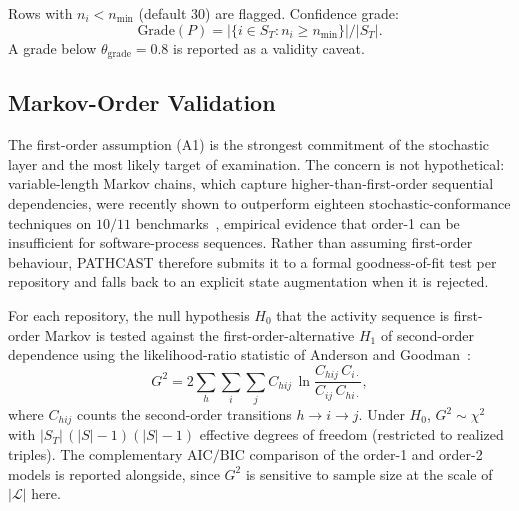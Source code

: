 Rows with $n_i < n_{\min}$ (default 30) are flagged. Confidence grade:
\begin{equation}
\label{eq:confidence-grade}
\text{Grade}(P) = |\{i \in S_T : n_i \geq n_{\min}\}| / |S_T|.
\end{equation}
A grade below $\theta_{\text{grade}} = 0.8$ is reported as a validity
caveat.


\subsection{Markov-Order Validation}
\label{sec:s3-order}

The first-order assumption (A1) is the strongest commitment of the
stochastic layer and the most likely target of examination. The concern is
not hypothetical: variable-length Markov chains, which capture
higher-than-first-order sequential dependencies, were recently shown to
outperform eighteen stochastic-conformance techniques on $10/11$
benchmarks~\cite{incerto2025}, empirical evidence that order-1 can be
insufficient for software-process sequences. Rather than
assuming first-order behaviour, PATHCAST therefore submits it to a formal
goodness-of-fit test per repository and falls back to an explicit state
augmentation when it is rejected.

\begin{definition}
\label{def:markov-order-test}
For each repository, the null hypothesis $H_0$ that the activity sequence is
first-order Markov is tested against the first-order-alternative $H_1$ of
second-order dependence using the likelihood-ratio statistic of
Anderson and Goodman~\cite{anderson1957statistical}:
\begin{equation}
\label{eq:markov-order}
G^2 = 2 \sum_{h}\sum_{i}\sum_{j}
   C_{hij} \, \ln \frac{C_{hij}\, C_{i\cdot}}{C_{ij}\, C_{hi\cdot}},
\end{equation}
where $C_{hij}$ counts the second-order transitions $h \to i \to j$. Under
$H_0$, $G^2 \sim \chi^2$ with $|S_T|\,(|S|-1)(|S|-1)$ effective degrees of
freedom (restricted to realized triples). The complementary
$\mathrm{AIC}/\mathrm{BIC}$ comparison of the order-1 and order-2 models is
reported alongside, since $G^2$ is sensitive to sample size at the scale of
$|\mathcal{L}|$ here.
\end{definition}

